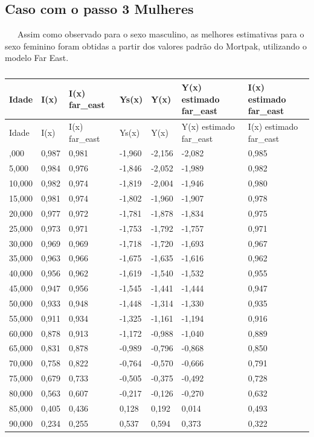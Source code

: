 \documentclass[
  12pt,
  a4paper,
]{scrreprt}
\begin{document}
\subsection{Caso com o passo 3
Mulheres}\label{caso-com-o-passo-3-mulheres}

~~~Assim como observado para o sexo masculino, as melhores estimativas
para o sexo feminino foram obtidas a partir dos valores padrão do
Mortpak, utilizando o modelo Far East.

\begin{longtable}[]{@{}lllllll@{}}
\caption{}\label{T_9c25d}\tabularnewline
\toprule\noalign{}
Idade & I(x) & I(x) far\_east & Ys(x) & Y(x) & Y(x) estimado far\_east &
I(x) estimado far\_east \\
\midrule\noalign{}
\endfirsthead
\toprule\noalign{}
Idade & I(x) & I(x) far\_east & Ys(x) & Y(x) & Y(x) estimado far\_east &
I(x) estimado far\_east \\
\midrule\noalign{}
\endhead
\bottomrule\noalign{}
\endlastfoot
1,000 & 0,987 & 0,981 & -1,960 & -2,156 & -2,082 & 0,985 \\
5,000 & 0,984 & 0,976 & -1,846 & -2,052 & -1,989 & 0,982 \\
10,000 & 0,982 & 0,974 & -1,819 & -2,004 & -1,946 & 0,980 \\
15,000 & 0,981 & 0,974 & -1,802 & -1,960 & -1,907 & 0,978 \\
20,000 & 0,977 & 0,972 & -1,781 & -1,878 & -1,834 & 0,975 \\
25,000 & 0,973 & 0,971 & -1,753 & -1,792 & -1,757 & 0,971 \\
30,000 & 0,969 & 0,969 & -1,718 & -1,720 & -1,693 & 0,967 \\
35,000 & 0,963 & 0,966 & -1,675 & -1,635 & -1,616 & 0,962 \\
40,000 & 0,956 & 0,962 & -1,619 & -1,540 & -1,532 & 0,955 \\
45,000 & 0,947 & 0,956 & -1,545 & -1,441 & -1,444 & 0,947 \\
50,000 & 0,933 & 0,948 & -1,448 & -1,314 & -1,330 & 0,935 \\
55,000 & 0,911 & 0,934 & -1,325 & -1,161 & -1,194 & 0,916 \\
60,000 & 0,878 & 0,913 & -1,172 & -0,988 & -1,040 & 0,889 \\
65,000 & 0,831 & 0,878 & -0,989 & -0,796 & -0,868 & 0,850 \\
70,000 & 0,758 & 0,822 & -0,764 & -0,570 & -0,666 & 0,791 \\
75,000 & 0,679 & 0,733 & -0,505 & -0,375 & -0,492 & 0,728 \\
80,000 & 0,563 & 0,607 & -0,217 & -0,126 & -0,270 & 0,632 \\
85,000 & 0,405 & 0,436 & 0,128 & 0,192 & 0,014 & 0,493 \\
90,000 & 0,234 & 0,255 & 0,537 & 0,594 & 0,373 & 0,322 \\
\end{longtable}
\end{document}
